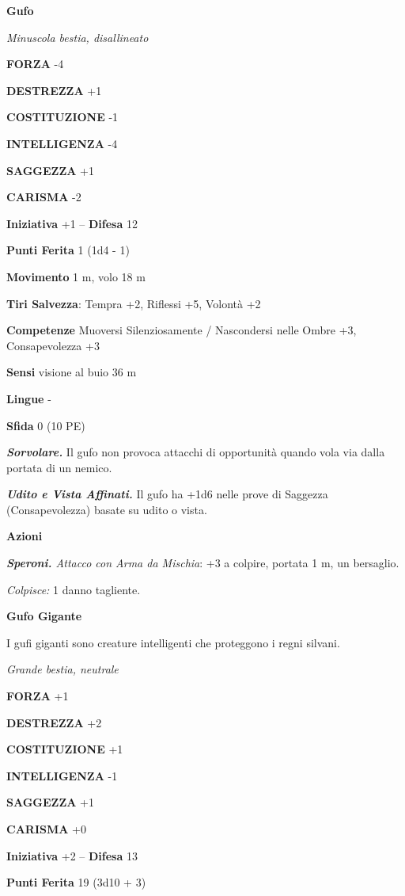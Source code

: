 \begin{multicols}{2}
\medskip\textbf{Gufo}

\emph{Minuscola bestia, disallineato}

\textbf{FORZA} -4

\textbf{DESTREZZA} +1

\textbf{COSTITUZIONE} -1

\textbf{INTELLIGENZA} -4

\textbf{SAGGEZZA} +1

\textbf{CARISMA} -2

\textbf{Iniziativa} +1 -- \textbf{Difesa} 12

\textbf{Punti Ferita} 1 (1d4 - 1)

\textbf{Movimento} 1 m, volo 18 m

\textbf{Tiri Salvezza}: Tempra +2, Riflessi +5, Volontà +2 

\textbf{Competenze} Muoversi Silenziosamente / Nascondersi nelle Ombre +3, Consapevolezza +3

\textbf{Sensi} visione al buio 36 m

\textbf{Lingue} -

\textbf{Sfida} 0 (10 PE)

\emph{\textbf{Sorvolare.}} Il gufo non provoca attacchi di opportunità quando vola via dalla portata di un nemico.

\emph{\textbf{Udito e Vista Affinati.}} Il gufo ha +1d6 nelle prove di Saggezza (Consapevolezza) basate su udito o vista.

\textbf{Azioni}

\emph{\textbf{Speroni.} Attacco con Arma da Mischia}: +3 a colpire, portata 1 m, un bersaglio.

\emph{Colpisce:} 1 danno tagliente.

\medskip\textbf{Gufo Gigante}

I gufi giganti sono creature intelligenti che proteggono i regni silvani.

\emph{Grande bestia, neutrale}

\textbf{FORZA} +1

\textbf{DESTREZZA} +2

\textbf{COSTITUZIONE} +1

\textbf{INTELLIGENZA} -1

\textbf{SAGGEZZA} +1

\textbf{CARISMA} +0

\textbf{Iniziativa} +2 -- \textbf{Difesa} 13

\textbf{Punti Ferita} 19 (3d10 + 3)


\end{multicols}
